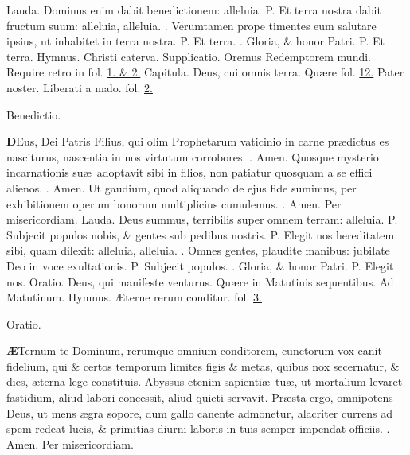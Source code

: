 \documentclass[letter,11pt]{book}
\makeatletter
\DeclareRobustCommand{\Vbar}{\vers@resp{-0.1em}{V}}
\DeclareRobustCommand{\Rbar}{\vers@resp{0pt}{R}}
\newcommand{\vers@resp@sym}{\raisebox{0.2ex}{\rotatebox[origin=c]{-20}{$\m@th\rceil$}}}
\newcommand{\vers@resp}[2]{%
  {\ooalign{\hidewidth\kern#1\vers@resp@sym\hidewidth\cr#2\cr}}%
}%
\def\P{\color{Red} P. \color{black}}
\def\V{\color{Red} \Vbar . \color{black}}
\def\R{\color{Red} \Rbar . \color{black}}
\makeatother
\begin{document}
\begin{multicols}{2}
\newline \color{Red} Lauda. \color{black} Dominus enim dabit benedictionem: alleluia. \P Et terra nostra dabit fructum suum: alleluia, alleluia. \V Verumtamen prope timentes eum salutare ipsius, ut inhabitet in terra nostra. \P Et terra. \V Gloria, \& honor Patri. \P Et terra.
\newline \color{Red} Hymnus. \color{black} Christi caterva. \color{Red} Supplicatio. \color{black} Oremus Redemptorem mundi. \color{Red} Require retro in fol. \color{black} \hyperlink{DOM-PRIMA-ADV-VES}{1. \& 2.} \color{Red} Capitula. \color{black} Deus, cui omnis terra. \color{Red} Qu\ae re fol. \color{black} \hyperlink{page.11}{12.} Pater noster. Liberati a malo. \color{Red} fol. \color{black} \hyperlink{page.2}{2.}
\vspace{-.75em} \begin{center} \color{Red} Benedictio. \end{center} \vspace{-.75em}
\lettrine[lines=2]{\bfseries \color{Red} D}{}Eus, Dei Patris Filius, qui olim Prophetarum vaticinio in carne pr\ae dictus es nasciturus, nascentia in nos virtutum corrobores. \R Amen. Quosque mysterio incarnationis su\ae \ adoptavit sibi in filios, non patiatur quosquam a se effici alienos. \R Amen. Ut gaudium, quod aliquando de ejus fide sumimus, per exhibitionem operum bonorum multiplicius cumulemus. \R Amen. Per misericordiam.
\newline \color{Red} Lauda. \color{black} Deus summus, terribilis super omnem terram: alleluia. \P Subjecit populos nobis, \& gentes sub pedibus nostris. \P Elegit nos hereditatem sibi, quam dilexit: alleluia, alleluia. \V Omnes gentes, plaudite manibus: jubilate Deo in voce exultationis. \P Subjecit populos. \V Gloria, \& honor Patri. \P Elegit nos. \color{Red} Oratio. \color{black} Deus, qui manifeste venturus. \color{Red} Qu\ae re in Matutinis sequentibus. \color{black}
\newline \color{Red} \hypertarget{DOM-SECUNDA-ADV-MAT}{Ad Matutinum.} Hymnus. \color{black} \AE terne rerum conditur. \color{Red} fol. \color{black} \hyperlink{DOM-PRIMA-ADV-MAT}{3.}
\vspace{-.75em} \begin{center} \color{Red} Oratio. \end{center} \vspace{-.75em}
\lettrine[lines=2]{\bfseries \color{Red} \AE}{}Ternum te Dominum, rerumque omnium conditorem, cunctorum vox canit fidelium, qui \& certos temporum limites figis \& metas, quibus nox secernatur, \& dies, \ae terna lege constituis. Abyssus etenim sapienti\ae \ tu\ae , ut mortalium levaret fastidium, aliud labori concessit, aliud quieti servavit. Pr\ae sta ergo, omnipotens Deus, ut mens \ae gra sopore, dum gallo canente admonetur, alacriter currens ad spem redeat lucis, \& primitias diurni laboris in tuis semper impendat officiis. \R Amen. Per misericordiam.

\end{multicols}
\end{document}
